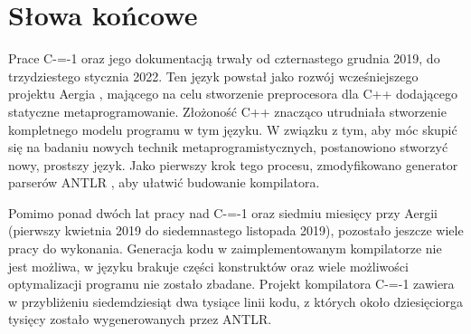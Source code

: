 \section{Słowa końcowe}

Prace C-=-1 oraz jego dokumentacją trwały od czternastego grudnia 2019, do trzydziestego stycznia 2022.
Ten język powstał jako rozwój wcześniejszego projektu Aergia \cite{grabski:aergia}, mającego na celu stworzenie preprocesora dla C++ dodającego statyczne metaprogramowanie.
Złożoność C++ znacząco utrudniała stworzenie kompletnego modelu programu w tym języku.
W związku z tym, aby móc skupić się na badaniu nowych technik metaprogramistycznych, postanowiono stworzyć nowy, prostszy język.
Jako pierwszy krok tego procesu, zmodyfikowano generator parserów ANTLR \cite{grabski2020}, aby ułatwić budowanie kompilatora.

Pomimo ponad dwóch lat pracy nad C-=-1 oraz siedmiu miesięcy przy Aergii (pierwszy kwietnia 2019 do siedemnastego listopada 2019), pozostało jeszcze wiele pracy do wykonania.
Generacja kodu w zaimplementowanym kompilatorze nie jest możliwa, w języku brakuje części konstruktów oraz wiele możliwości optymalizacji programu nie zostało zbadane.
Projekt kompilatora C-=-1 zawiera w przybliżeniu siedemdziesiąt dwa tysiące linii kodu, z których około dziesięciorga tysięcy zostało wygenerowanych przez ANTLR.



